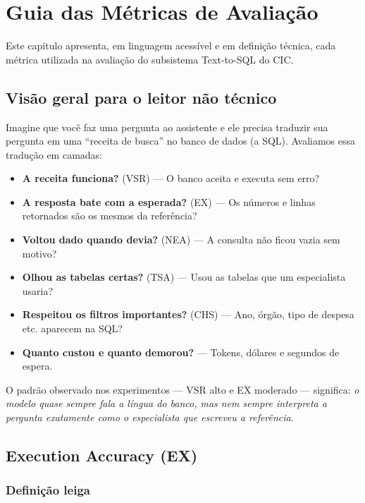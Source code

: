 \chapter{Guia das Métricas de Avaliação}

Este capítulo apresenta, em linguagem acessível e em definição técnica, cada métrica utilizada na avaliação do subsistema Text-to-SQL do CIC.

\section{Visão geral para o leitor não técnico}

Imagine que você faz uma pergunta ao assistente e ele precisa traduzir sua pergunta em uma ``receita de busca'' no banco de dados (a SQL). Avaliamos essa tradução em camadas:

\begin{itemize}
    \item \textbf{A receita funciona?} (VSR) --- O banco aceita e executa sem erro?
    \item \textbf{A resposta bate com a esperada?} (EX) --- Os números e linhas retornados são os mesmos da referência?
    \item \textbf{Voltou dado quando devia?} (NEA) --- A consulta não ficou vazia sem motivo?
    \item \textbf{Olhou as tabelas certas?} (TSA) --- Usou as tabelas que um especialista usaria?
    \item \textbf{Respeitou os filtros importantes?} (CHS) --- Ano, órgão, tipo de despesa etc. aparecem na SQL?
    \item \textbf{Quanto custou e quanto demorou?} --- Tokens, dólares e segundos de espera.
\end{itemize}

O padrão observado nos experimentos --- VSR alto e EX moderado --- significa: \textit{o modelo quase sempre fala a língua do banco, mas nem sempre interpreta a pergunta exatamente como o especialista que escreveu a referência}.

\section{Execution Accuracy (EX)}

\subsection{Definição leiga}

